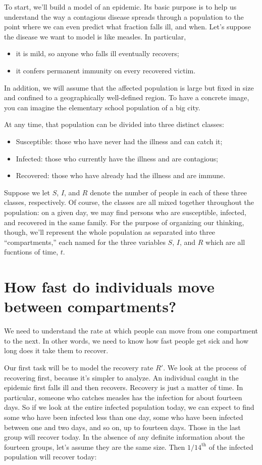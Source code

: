 \documentclass
[justified,nohyper]
{tufte-handout}
\begin{document}
To start, we'll build a model of an epidemic. Its basic purpose is to help us 
understand the way a contagious disease spreads through a population to the point 
where we can even predict what fraction falls ill, and when. Let's suppose the 
disease we want to model is like measles. In particular,
\begin{itemize}
    \item it is mild, so anyone who falls ill eventually recovers;
    \item it confers permanent immunity on every recovered victim.
\end{itemize}

In addition, we will assume that the affected population is large but fixed in 
size and confined to a geographically well-defined region. To have a concrete 
image, you can imagine the elementary school population of a big city.

At any time, that population can be divided into three distinct classes:
\begin{itemize}
    \item Susceptible: those who have never had the illness and can catch it;
    \item Infected: those who currently have the illness and are contagious;
    \item Recovered: those who have already had the illness and are immune.
\end{itemize}

Suppose we let $S$, $I$, and $R$ denote the number of people in each of these 
three classes, respectively. Of course, the classes are all mixed together 
throughout the population: on a given day, we may find persons who are 
susceptible, infected, and recovered in the same family. For the purpose of 
organizing our thinking, though, we'll represent the whole population as 
separated into three ``compartments,'' each named for the three variables $S$, 
$I$, and $R$ which are all fucntions of time, $t$.

\section{How fast do individuals move between compartments?} 
We need to understand the rate at which people can move from one compartment to 
the next. In other words, we need to know how fast people get sick and how long 
does it take them to recover.

Our first task will be to model the recovery rate $R'$. We look at the process of 
recovering first, because it's simpler to analyze. An individual caught in the 
epidemic first falls ill and then recovers. Recovery is just a matter of time. In 
particular, someone who catches measles has the infection for about fourteen 
days. So if we look at the entire infected population today, we can expect to 
find some who have been infected less than one day, some who have been infected 
between one and two days, and so on, up to fourteen days. Those in the last group 
will recover today. In the absence of any definite information about the fourteen 
groups, let's assume they are the same size. Then $1/14^{\text{th}}$ of the 
infected population will recover today:
\end{document}
